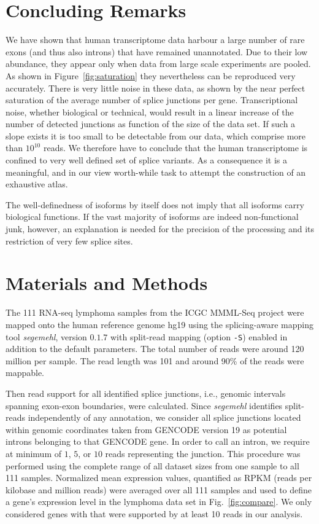 \documentclass[ncrna,article,submit,moreauthors,pdftex,10pt,a4paper]{mdpi}
\begin{document}
\section{Concluding Remarks} 

We have shown that human transcriptome data harbour a large number of rare
exons (and thus also introns) that have remained unannotated. Due to their
low abundance, they appear only when data from large scale experiments are
pooled. As shown in Figure~\ref{fig:saturation} they nevertheless can be
reproduced very accurately. There is very little noise in these data, as
shown by the near perfect saturation of the average number of splice
junctions per gene. Transcriptional noise, whether biological or technical,
would result in a linear increase of the number of detected junctions as
function of the size of the data set. If such a slope exists it is too
small to be detectable from our data, which comprise more than $10^{10}$
reads. We therefore have to conclude that the human transcriptome is
confined to very well defined set of splice variants. As a consequence it
is a meaningful, and in our view worth-while task to attempt the
construction of an exhaustive atlas.

The well-definedness of isoforms by itself does not imply that all isoforms
carry biological functions. If the vast majority of isoforms are indeed
non-functional junk, however, an explanation is needed for the precision of
the processing and its restriction of very few splice sites.

\section{Materials and Methods}

The 111 RNA-seq lymphoma samples from the ICGC MMML-Seq project
\cite{Richter:12a} were mapped onto the human reference genome hg19 using
the splicing-aware mapping tool \textit{segemehl}, version $0.1.7$
\cite{Hoffmann:09a,Hoffmann:14a} with split-read mapping (option
\texttt{-S}) enabled in addition to the default parameters. The total
number of reads were around 120 million per sample. The read length was 101
and around 90\% of the reads were mappable.

Then read support for all identified splice junctions, i.e., genomic
intervals spanning exon-exon boundaries, were calculated. Since
\textit{segemehl} identifies split-reads independently of any annotation,
we consider all splice junctions located within genomic coordinates taken
from GENCODE version 19 as potential introns belonging to that GENCODE
gene. In order to call an intron, we require at minimum of $1$, $5$, or
$10$ reads representing the junction.  This procedure was performed using
the complete range of all dataset sizes from one sample to all 111 samples.
Normalized mean expression values, quantified as RPKM (reads per kilobase
and million reads) were averaged over all 111 samples and used to define a
gene's expression level in the lymphoma data set in Fig.\
\ref{fig:compare}. We only considered genes with that were supported by at
least 10 reads in our analysis.
\end{document}
